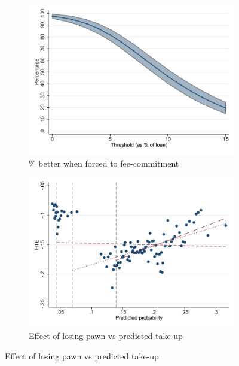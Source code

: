 \documentclass[oneside,11pt]{article}
\begin{document}
\begin{figure}[H]
\begin{center}
\begin{subfigure}{0.45\textwidth}
    \end{subfigure}
        \begin{subfigure}{0.45\textwidth}
        \caption{\% better when forced to fee-commitment}
        \centering
        \includegraphics[width=\textwidth]{Figuras/line_better_forceall_eff_te_cf.pdf}
        
    \end{subfigure}
        \begin{subfigure}{0.45\textwidth}
        \caption{\footnotesize{Effect of losing pawn vs predicted take-up}}
        \centering
        \includegraphics[width=\textwidth]{Figuras/takeuppr_def.pdf}
    \end{subfigure}
    

\end{center}
\end{figure}
\end{document}
